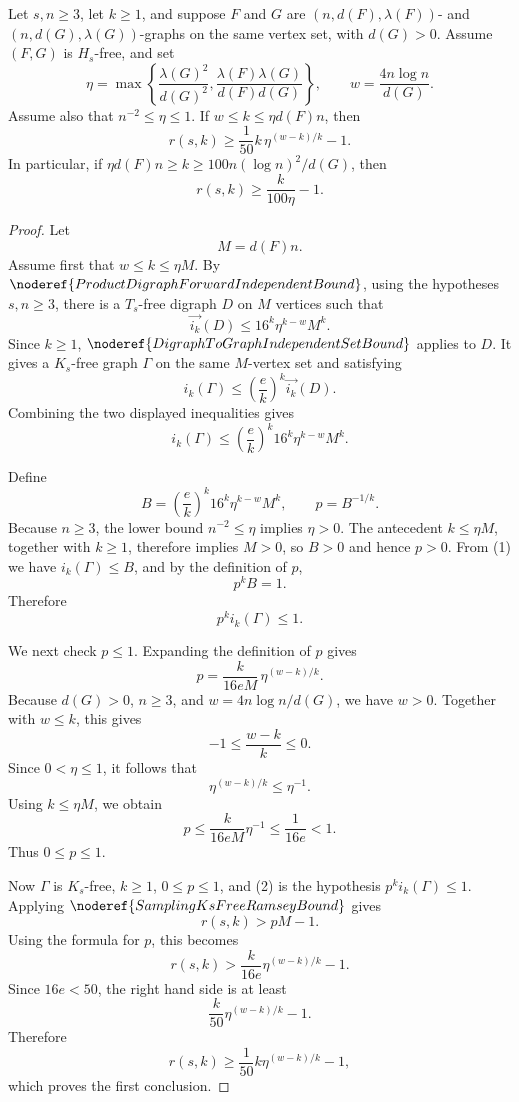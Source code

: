 \begin{theorem}
Let \(s,n\ge 3\), let \(k\ge 1\), and suppose \(F\) and \(G\) are \((n,d(F),\lambda(F))\)- and \((n,d(G),\lambda(G))\)-graphs on the same vertex set, with \(d(G)>0\). Assume \((F,G)\) is \(H_s\)-free, and set
\[
  \eta=\max\left\{\frac{\lambda(G)^2}{d(G)^2},
  \frac{\lambda(F)\lambda(G)}{d(F)d(G)}\right\},
  \qquad
  w=\frac{4n\log n}{d(G)}.
\]
Assume also that \(n^{-2}\le \eta\le 1\).
If \(w\le k\le \eta d(F)n\), then
\[
  r(s,k)\ge \frac{1}{50} k\,\eta^{(w-k)/k}-1.
\]
In particular, if \(\eta d(F)n\ge k\ge 100n(\log n)^2/d(G)\), then
\[
  r(s,k)\ge \frac{k}{100\eta}-1.
\]
\end{theorem}
\begin{proof}
Let
\[
  M=d(F)n.
\]
Assume first that \(w\le k\le \eta M\). By \(\noderef{ProductDigraphForwardIndependentBound}\), using the hypotheses \(s,n\ge3\), there is a \(T_s\)-free digraph \(D\) on \(M\) vertices such that
\[
  \overrightarrow{i_k}(D)\le 16^k\eta^{k-w}M^k.
\]
Since \(k\ge1\), \(\noderef{DigraphToGraphIndependentSetBound}\) applies to \(D\). It gives a \(K_s\)-free graph \(\Gamma\) on the same \(M\)-vertex set and satisfying
\[
  i_k(\Gamma)\le \left(\frac{e}{k}\right)^k\overrightarrow{i_k}(D).
\]
Combining the two displayed inequalities gives
\[
  i_k(\Gamma)\le
  \left(\frac{e}{k}\right)^k16^k\eta^{k-w}M^k. \tag{1}
\]

Define
\[
  B=\left(\frac{e}{k}\right)^k16^k\eta^{k-w}M^k,
  \qquad
  p=B^{-1/k}.
\]
Because \(n\ge3\), the lower bound \(n^{-2}\le\eta\) implies \(\eta>0\). The antecedent \(k\le \eta M\), together with \(k\ge1\), therefore implies \(M>0\), so \(B>0\) and hence \(p>0\). From (1) we have \(i_k(\Gamma)\le B\), and by the definition of \(p\),
\[
  p^k B=1.
\]
Therefore
\[
  p^k i_k(\Gamma)\le 1. \tag{2}
\]

We next check \(p\le1\). Expanding the definition of \(p\) gives
\[
  p=\frac{k}{16eM}\,\eta^{(w-k)/k}.
\]
Because \(d(G)>0\), \(n\ge3\), and \(w=4n\log n/d(G)\), we have \(w>0\). Together with \(w\le k\), this gives
\[
  -1\le \frac{w-k}{k}\le0.
\]
Since \(0<\eta\le1\), it follows that
\[
  \eta^{(w-k)/k}\le \eta^{-1}.
\]
Using \(k\le \eta M\), we obtain
\[
  p\le \frac{k}{16eM}\eta^{-1}\le \frac1{16e}<1.
\]
Thus \(0\le p\le1\).

Now \(\Gamma\) is \(K_s\)-free, \(k\ge1\), \(0\le p\le1\), and (2) is the hypothesis \(p^k i_k(\Gamma)\le1\). Applying \(\noderef{SamplingKsFreeRamseyBound}\) gives
\[
  r(s,k)>pM-1.
\]
Using the formula for \(p\), this becomes
\[
  r(s,k)>
  \frac{k}{16e}\eta^{(w-k)/k}-1.
\]
Since \(16e<50\), the right hand side is at least
\[
  \frac{k}{50}\eta^{(w-k)/k}-1.
\]
Therefore
\[
  r(s,k)\ge \frac{1}{50}k\eta^{(w-k)/k}-1,
\]
which proves the first conclusion.


\end{proof}
